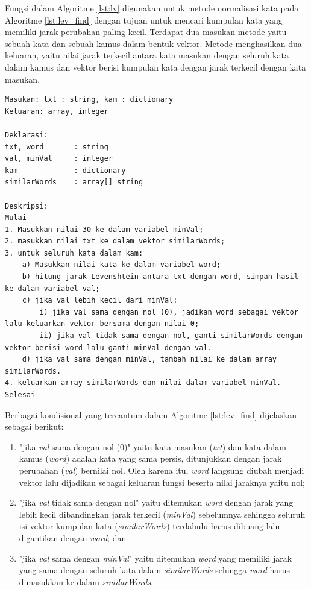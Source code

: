 Fungsi dalam Algoritme \ref{lst:lv} digunakan untuk metode normalisasi kata pada Algoritme \ref{lst:lev_find} dengan tujuan untuk mencari kumpulan kata yang memiliki jarak perubahan paling kecil. Terdapat dua masukan metode yaitu sebuah kata dan sebuah kamus dalam bentuk vektor. Metode menghasilkan dua keluaran, yaitu nilai jarak terkecil antara kata masukan dengan seluruh kata dalam kamus dan vektor berisi kumpulan kata dengan jarak terkecil dengan kata masukan.
\begin{lstlisting}[caption={Algoritme Fungsi Normalisasi Kata dengan Jarak Levenshtein},label={lst:lev_find},float,floatplacement=h]
Masukan: txt : string, kam : dictionary
Keluaran: array, integer

Deklarasi:
txt, word		: string
val, minVal 	: integer
kam				: dictionary
similarWords	: array[] string

Deskripsi:
Mulai
1. Masukkan nilai 30 ke dalam variabel minVal;
2. masukkan nilai txt ke dalam vektor similarWords;
3. untuk seluruh kata dalam kam:
	a) Masukkan nilai kata ke dalam variabel word;
	b) hitung jarak Levenshtein antara txt dengan word, simpan hasil ke dalam variabel val;
	c) jika val lebih kecil dari minVal:
		i) jika val sama dengan nol (0), jadikan word sebagai vektor lalu keluarkan vektor bersama dengan nilai 0;
		ii) jika val tidak sama dengan nol, ganti similarWords dengan vektor berisi word lalu ganti minVal dengan val.
	d) jika val sama dengan minVal, tambah nilai ke dalam array similarWords.
4. keluarkan array similarWords dan nilai dalam variabel minVal.
Selesai
\end{lstlisting}

Berbagai kondisional yang tercantum dalam Algoritme \ref{lst:lev_find} dijelaskan sebagai berikut:
\begin{enumerate}
	\item "jika \textit{val} sama dengan nol (0)" yaitu kata masukan (\textit{txt}) dan kata dalam kamus (\textit{word}) adalah kata yang sama persis, ditunjukkan dengan jarak perubahan (\textit{val}) bernilai nol. Oleh karena itu, \textit{word} langsung diubah menjadi vektor lalu dijadikan sebagai keluaran fungsi beserta nilai jaraknya yaitu nol;
	\item "jika \textit{val} tidak sama dengan nol" yaitu ditemukan \textit{word} dengan jarak yang lebih kecil dibandingkan jarak terkecil (\textit{minVal}) sebelumnya sehingga seluruh isi vektor kumpulan kata (\textit{similarWords}) terdahulu harus dibuang lalu digantikan dengan \textit{word}; dan
	\item "jika \textit{val} sama dengan \textit{minVal}" yaitu ditemukan \textit{word} yang memiliki jarak yang sama dengan seluruh kata dalam \textit{similarWords} sehingga \textit{word} harus dimasukkan ke dalam \textit{similarWords}.
\end{enumerate}

